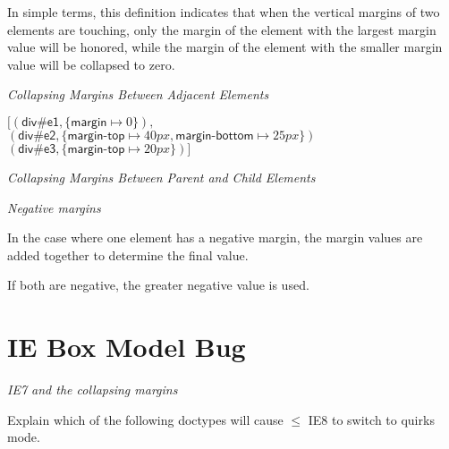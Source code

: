 In simple terms, 
this definition indicates that when the 
vertical margins of two elements are touching, 
only the margin of the element with the largest margin value will be honored,
while the margin of the element with the smaller margin value will be collapsed to zero.




\frmrule 

\textit{Collapsing Margins Between Adjacent Elements}

\begin{example}
$[(\textsf{div\#e1}, \{\textsf{margin} \mapsto 0 \}),$\\
$(\textsf{div\#e2}, \{\textsf{margin-top} \mapsto 40px, \textsf{margin-bottom} \mapsto 25px\})$\\
$(\textsf{div\#e3}, \{\textsf{margin-top} \mapsto 20px \})]$
\end{example}


\frmrule 

\textit{Collapsing Margins Between Parent and Child Elements}

\frmrule 

\textit{Negative margins}

In the case where one element has a negative margin, 
the margin values are added together to determine the final value. 

If both are negative, the greater negative value is used.


\section{IE Box Model Bug}






\frmrule 

\textit{IE7 and the collapsing margins}








\frmrule 

\begin{example}
Explain which of the following doctypes will cause $\leqslant$ IE8 to switch to 
quirks mode.
\end{example}

\frmrule 


